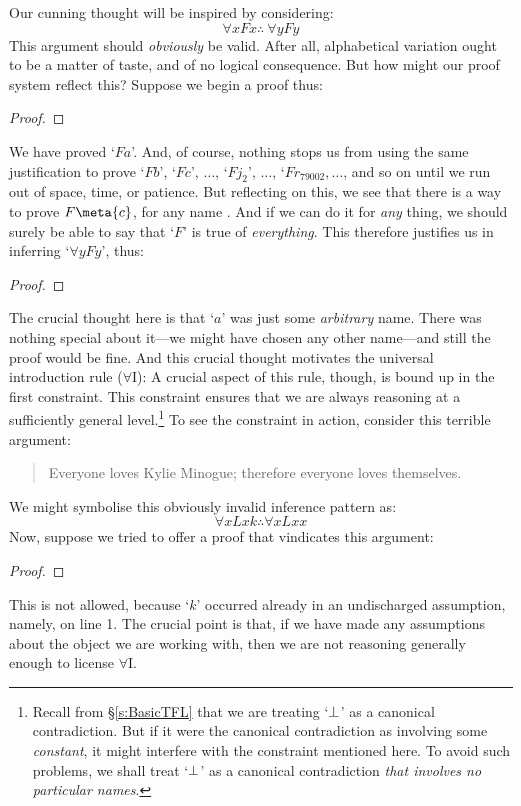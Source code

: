 Our cunning thought will be inspired by considering:
$$\forall x Fx \therefore\ \forall y Fy$$
This argument should \emph{obviously} be valid. After all, alphabetical variation ought to be a matter of taste, and of no logical consequence. But how might our proof system reflect this? Suppose we begin a proof thus:
\begin{proof}
	 
\end{proof}
We have proved `$Fa$'. And, of course, nothing stops us from using the same justification to prove `$Fb$', `$Fc$', $\ldots$, `$Fj_2$', $\ldots$, `$Fr_{79002}, \ldots$, and so on until we run out of space, time, or patience. But reflecting on this, we see that there is a way to prove $F\meta{c}$, for any name . And if we can do it for \emph{any} thing, we should surely be able to say that `$F$' is true of \emph{everything}. This therefore justifies us in inferring `$\forall y Fy$', thus:
\begin{proof}
	 
	 
\end{proof}
The crucial thought here is that `$a$' was just some \emph{arbitrary} name. There was nothing special about it---we might have chosen any other name---and still the proof would be fine. And this crucial thought motivates the universal introduction rule ($\forall$I):
A crucial aspect of this rule, though, is bound up in the first constraint. This constraint ensures that we are always reasoning at a sufficiently general level.\footnote{Recall from \S\ref{s:BasicTFL} that we are treating `$\bot$' as a canonical contradiction. But if it were the canonical contradiction as involving some \emph{constant}, it might interfere with the constraint mentioned here. To avoid such problems, we shall treat `$\bot$' as a canonical contradiction \emph{that involves no particular names}.} To see the constraint in action, consider this terrible argument:
	\begin{quote}
		Everyone loves Kylie Minogue; therefore everyone loves themselves.
	\end{quote}
We might symbolise this obviously invalid inference pattern as:
$$\forall x Lxk \therefore \forall x Lxx$$
Now, suppose we tried to offer a proof that vindicates this argument:
\begin{proof}
	 
	 
\end{proof}\noindent
This is not allowed, because `$k$' occurred already in an undischarged assumption, namely, on line 1. The crucial point is that, if we have made any assumptions about the object we are working with, then we are not reasoning generally enough to license $\forall$I.

